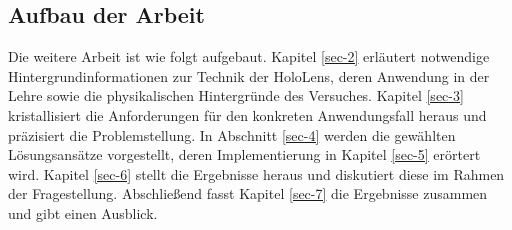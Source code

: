\begin{comment}
\subsection{Aufgabenstellung}

Im Rahmen der Arbeit soll anhand der HoloLens untersucht werden, wie diese in der Physik-Lehre eingesetzt werden kann, um physikalische Inhalte zu vermitteln. Insbesondere soll betrachtet werden, wie physikalische Experimente mittels Mixed Reality Anwendungen durch zusätzliche Inhalte angereichert werden können.\\

\par
Dazu sind zunächst die technischen Möglichkeiten und Voraussetzungen der HoloLens zu betrachten und in Zusammenhang mit dem Anwendungsfall zu bringen. Weiterhin sind bestehende Ansätze im Einsatz von Mixed Reality Technologie in der Lehre, besonders in der Physik-Lehre, herauszuarbeiten und einzuordnen.

Davon ausgehend soll der Fragestellung anhand eines konkreten Beispiels nachgegangen werden. Für einen ausgewählten Versuchsaufbau sind die darzustellenden Objekte und Informationen sowie das Zusammenspiel dieser mit dem aufgebauten Experiment, der Umgebung und den Nutzern zu entwickeln. Für den ausgewählten Anwendungsfall soll eine Umsetzung mit der HoloLens konzipiert, designet und prototypisch implementiert werden.
\end{comment}

\subsection{Aufbau der Arbeit}
\label{sec-1-3}
Die weitere Arbeit ist wie folgt aufgebaut. Kapitel \ref{sec-2} erläutert notwendige Hintergrundinformationen zur Technik der HoloLens, deren Anwendung in der Lehre sowie die physikalischen Hintergründe des Versuches. Kapitel \ref{sec-3} kristallisiert die Anforderungen für den konkreten Anwendungsfall heraus und präzisiert die Problemstellung. In Abschnitt \ref{sec-4} werden die gewählten Lösungsansätze vorgestellt, deren Implementierung in Kapitel \ref{sec-5} erörtert wird. Kapitel \ref{sec-6} stellt die Ergebnisse heraus und diskutiert diese im Rahmen der Fragestellung. Abschließend fasst Kapitel \ref{sec-7} die Ergebnisse zusammen und gibt einen Ausblick.